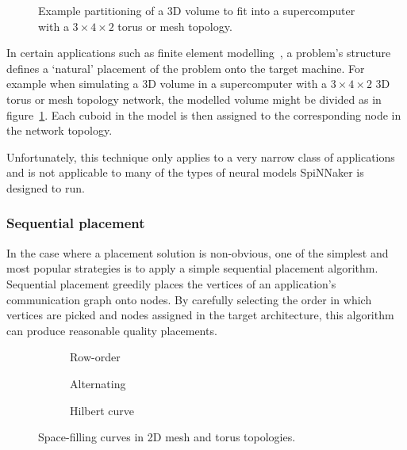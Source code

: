 				\begin{figure}
					\center
					
					\caption[Partitioning of a 3D volume for a $3\times4\times2$ torus.]%
					{Example partitioning of a 3D volume to fit into a supercomputer with
					a $3\times4\times2$ torus or mesh topology.}
					\label{fig:fem-partitioning}
				\end{figure}
				
				In certain applications such as finite element
				modelling~\cite{bermejo13}, a problem's structure defines a `natural'
				placement of the problem onto the target machine. For example when
				simulating a 3D volume in a supercomputer with a $3 \times 4 \times 2$
				3D torus or mesh topology network, the modelled volume might be divided
				as in figure~\ref{fig:fem-partitioning}. Each cuboid in the model is
				then assigned to the corresponding node in the network topology.
				
				Unfortunately, this technique only applies to a very narrow class of
				applications and is not applicable to many of the types of neural
				models SpiNNaker is designed to run.
			
			\subsubsection{Sequential placement}
				
				In the case where a placement solution is non-obvious, one of the
				simplest and most popular strategies is to apply a simple sequential
				placement algorithm. Sequential placement greedily places the vertices
				of an application's communication graph onto nodes. By carefully
				selecting the order in which vertices are picked and nodes assigned in
				the target architecture, this algorithm can produce reasonable quality
				placements.
				
				\begin{figure}
					\center
					\begin{subfigure}{0.32\linewidth}
						\center
						\caption{Row-order}
						\label{fig:sequential-row-order}
					\end{subfigure}
					\begin{subfigure}{0.32\linewidth}
						\center
						\caption{Alternating}
						\label{fig:sequential-alternating}
					\end{subfigure}
					\begin{subfigure}{0.32\linewidth}
						\center
						\caption{Hilbert curve}
						\label{fig:sequential-hilbert}
					\end{subfigure}
					
					\caption{Space-filling curves in 2D mesh and torus topologies.}
					\label{fig:sequential}
				\end{figure}
				
